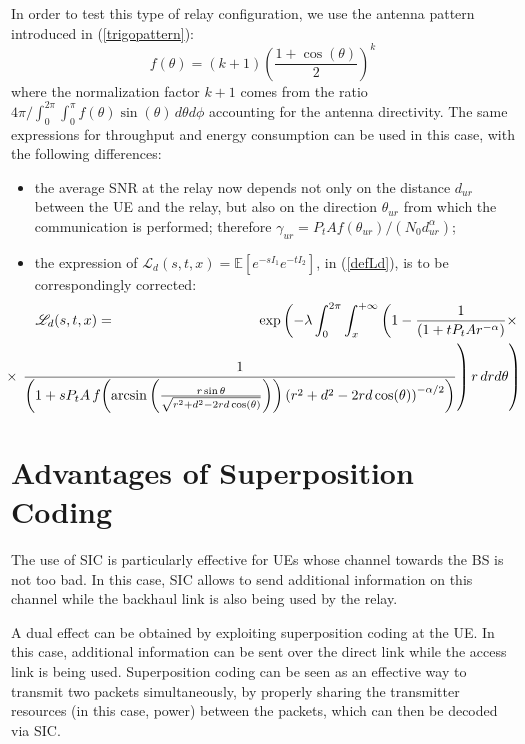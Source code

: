 \documentclass[12pt, letterpaper, onecolumn, draftcls]{IEEEtran}
\begin{document}
In order to test this type of relay configuration, we use the antenna pattern introduced in (\ref{trigopattern}):
\begin{equation}
 f(\theta) = (k+1)\left(\frac{1+\cos(\theta)}{2}\right)^k
\end{equation}
where the normalization factor $k+1$ comes from the ratio $4\pi/\int_0^{2\pi}\int_0^{\pi}f(\theta)\sin(\theta)\,d\theta d\phi$ accounting for the antenna directivity. The same expressions for throughput and energy consumption can be used in this case, with the following differences:
\begin{itemize}
 \item the average SNR at the relay now depends not only on the distance $d_{ur}$ between the UE and the relay, but also on the direction $\theta_{ur}$ from which the communication is performed; therefore $\gamma_{ur} = P_tAf(\theta_{ur})/(N_0d_{ur}^{\alpha})$;
 \item the expression of $\mathscr{L}_d(s,t,x) = \mathbb{E}\left[e^{-sI_1}e^{-tI_2}\right]$, in (\ref{defLd}), is to be correspondingly corrected:
 \begin{eqnarray}
 \mathscr{L}_d(s,t,x) & = & \exp\left(-\lambda\int_0^{2\pi}\int_x^{+\infty}\left(1-\frac{1}{\left(1+tP_tAr^{-\alpha}\right)}\times\right.\right.\nonumber\\
 &\hspace{-4cm} &\hspace{-3cm} \times\left.\left.\frac{1}{\left(1+sP_tA\,f\!\left(\arcsin\left(\frac{r\sin\theta}{\sqrt{r^2+d^2-2rd\cos(\theta)}}\right)\right)\left(r^2+d^2-2rd\cos(\theta)\right)^{-\alpha/2}\right)}\right)r\,drd\theta\right)
 \label{defLdmod}
\end{eqnarray}
\end{itemize}

\section{Advantages of Superposition Coding}
\label{adv_SC}
The use of SIC is particularly effective for UEs whose channel towards the BS is not too bad. In this case, SIC allows to send additional information on this channel while the backhaul link is also being used by the relay.

A dual effect can be obtained by exploiting superposition coding at the UE. In this case, additional information can be sent over the direct link while the access link is being used. Superposition coding can be seen as an effective way to transmit two packets simultaneously, by properly sharing the transmitter resources (in this case, power) between the packets, which can then be decoded via SIC.
\end{document}
